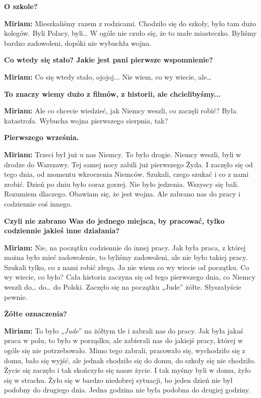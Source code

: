 \textbf{O szkole?} 

\textbf{Miriam:} Mieszkaliśmy razem z rodzicami. Chodziło się do szkoły, było tam dużo kolegów. Byli Polacy, byli… W ogóle nie czuło się, że to małe miasteczko. Byliśmy bardzo zadowoleni, dopóki nie wybuchła wojna. 

\textbf{Co wtedy się stało? Jakie jest pani pierwsze wspomnienie?} 

\textbf{Miriam:} Co się wtedy stało, ojojoj... Nie wiem, co wy wiecie, ale… 

\textbf{To znaczy wiemy dużo z filmów, z historii, ale chcielibyśmy...} 

\textbf{Miriam:} Ale co chcecie wiedzieć, jak Niemcy weszli, co zaczęli robić? Była katastrofa. Wybucha wojna pierwszego sierpnia, tak? 

\textbf{Pierwszego września.} 

\textbf{Miriam:} Trzeci był już u nas Niemcy. To było drogie. Niemcy weszli, byli w drodze do Warszawy. Tej samej nocy zabili już pierwszego Żyda. I zaczęło się od tego dnia, od momentu wkroczenia Niemców. Szukali, czego szukać i co z nami zrobić. Dzień po dniu było coraz gorzej. Nie było jedzenia. Wszyscy się bali. Rozumiem dlaczego. Obawiam się, że jest wojna. Ale zabrano nas do pracy i codziennie coś innego.

\textbf{Czyli nie zabrano Was do jednego miejsca, by pracować, tylko codziennie jakieś inne działania?} 

\textbf{Miriam:} Nie, na początku codziennie do innej pracy. Jak była praca, z której można było mieć zadowolenie, to byliśmy zadowoleni, ale nie było takiej pracy. Szukali tylko, co z nami robić złego. Ja nie wiem co wy wiecie od początku. Co wy wiecie, co było? Cała historia zaczyna się od tego pierwszego dnia, co Niemcy weszli do… do… do Polski. Zaczęło się na początku „Jude” żółte. Słyszałyście pewnie. 

\textbf{Żółte oznaczenia?}

\textbf{Miriam:} To było „\textit{Jude}” na żółtym tle i zabrali nas do pracy. Jak była jakaś praca w polu, to było w porządku, ale zabierali nas do jakiejś pracy, której w ogóle się nie potrzebowało. Mimo tego zabrali, pracowało się, wychodziło się z domu, bało się wyjść, ale jednak chodziło się do domu, do szkoły się nie chodziło. Życie się zaczęło i tak skończyło się nasze życie. I tak myśmy byli w domu, żyło się w strachu. Żyło się w bardzo niedobrej sytuacji, bo jeden dzień nie był podobny do drugiego dnia. Jedna godzina nie była podobna do drugiej godziny. 

